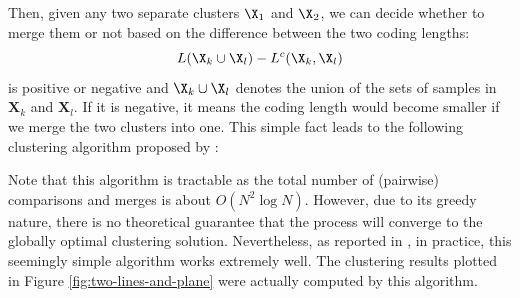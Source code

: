 \documentclass[../../book-main.tex]{subfiles}
\begin{document}
Then, given any two separate clusters $\X_1$ and $\X_2$, we can decide whether to merge them or not based on the difference between the two coding lengths:
\begin{equation}
	L(\X_k \cup \X_l) - L^c(\X_k, \X_l)
\end{equation}
is positive or negative and $\X_k \cup \X_l$ denotes the union of the sets of samples in $\bm X_k$ and $\bm X_l$. If it is negative, it means the coding length would become smaller if we merge the two clusters into one. This simple fact leads to the following clustering algorithm proposed by \cite{ma2007segmentation}:
\begin{algorithm}[!htbp]
	\caption{Pairwise Steepest Descent of Coding Length}\label{alg:steepest_descent_coding_length}
	\begin{algorithmic}[1]

		 
		 
		\State{\Return{\(\cC\)}} 
		\Else
		 
		 
		\EndIf
		\EndWhile
		\State{\Return{\(\cC\)}}  
		\EndProcedure
	\end{algorithmic}
\end{algorithm}

Note that this algorithm is tractable as the total number of (pairwise) comparisons and merges is about $O(N^2\log N)$. However, due to its greedy nature, there is no theoretical guarantee that the process will converge to the globally optimal clustering solution. Nevertheless, as reported in \cite{ma2007segmentation}, in practice, this seemingly simple algorithm works extremely well. The clustering results plotted in Figure \ref{fig:two-lines-and-plane} were actually computed by this algorithm.
\end{document}
